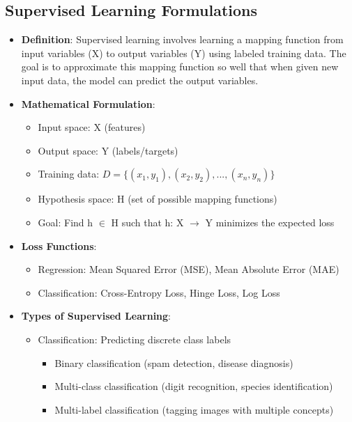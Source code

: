 \documentclass{article}
\begin{document}
\subsection{Supervised Learning Formulations}
\begin{itemize}
    \item \textbf{Definition}: Supervised learning involves learning a mapping function from input variables (X) to output variables (Y) using labeled training data. The goal is to approximate this mapping function so well that when given new input data, the model can predict the output variables.
    
    \item \textbf{Mathematical Formulation}:
    \begin{itemize}
        \item Input space: X (features)
        \item Output space: Y (labels/targets)
        \item Training data: $D = \{(x_1, y_1), (x_2, y_2), ..., (x_n, y_n)\}$
        \item Hypothesis space: H (set of possible mapping functions)
        \item Goal: Find h $\in$ H such that h: X $\rightarrow$ Y minimizes the expected loss
    \end{itemize}
    
    \item \textbf{Loss Functions}:
    \begin{itemize}
        \item Regression: Mean Squared Error (MSE), Mean Absolute Error (MAE)
        \item Classification: Cross-Entropy Loss, Hinge Loss, Log Loss
    \end{itemize}
    
    \item \textbf{Types of Supervised Learning}:
    \begin{itemize}
        \item Classification: Predicting discrete class labels
        \begin{itemize}
            \item Binary classification (spam detection, disease diagnosis)
            \item Multi-class classification (digit recognition, species identification)
            \item Multi-label classification (tagging images with multiple concepts)
        \end{itemize}
        

\end{itemize}
\end{itemize}
\end{document}
